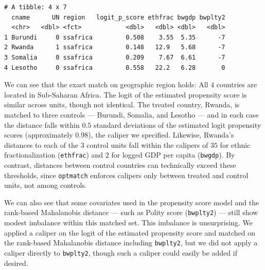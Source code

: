 \documentclass[
  12pt,
  leqno]{article}
\newenvironment{Shaded}{\begin{snugshade}}{\end{snugshade}}
\newcommand{\CommentTok}[1]{\textcolor[rgb]{0.56,0.35,0.01}{\textit{#1}}}
\newcommand{\FunctionTok}[1]{\textcolor[rgb]{0.13,0.29,0.53}{\textbf{#1}}}
\newcommand{\NormalTok}[1]{#1}
\newcommand{\OtherTok}[1]{\textcolor[rgb]{0.56,0.35,0.01}{#1}}
\newcommand{\SpecialCharTok}[1]{\textcolor[rgb]{0.81,0.36,0.00}{\textbf{#1}}}
\newcommand{\StringTok}[1]{\textcolor[rgb]{0.31,0.60,0.02}{#1}}
\begin{document}
\singlespacing

\begin{Shaded}
\end{Shaded}

\begin{verbatim}
# A tibble: 4 x 7
  cname      UN region   logit_p_score ethfrac bwgdp bwplty2
  <chr>   <dbl> <fct>            <dbl>   <dbl> <dbl>   <dbl>
1 Burundi     0 ssafrica         0.508    3.55  5.35      -7
2 Rwanda      1 ssafrica         0.148   12.9   5.68      -7
3 Somalia     0 ssafrica         0.209    7.67  6.61      -7
4 Lesotho     0 ssafrica         0.558   22.2   6.28       0
\end{verbatim}

\doublespacing

We can see that the exact match on geographic region holds: All \(4\)
countries are located in Sub-Saharan Africa. The logit of the estimated
propensity score is similar across units, though not identical. The
treated country, Rwanda, is matched to three controls --- Burundi,
Somalia, and Lesotho --- and in each case the distance falls within
\(0.5\) standard deviations of the estimated logit propensity scores
(approximately 0.98), the caliper we specified. Likewise, Rwanda's
distances to each of the \(3\) control units fall within the calipers of
\(35\) for ethnic fractionalization (\texttt{ethfrac}) and \(2\) for
logged GDP per capita (\texttt{bwgdp}). By contrast, distances between
control countries can technically exceed these thresholds, since
\texttt{optmatch} enforces calipers only between treated and control
units, not among controls.

We can also see that some covariates used in the propensity score model
and the rank-based Mahalanobis distance --- such as Polity score
(\texttt{bwplty2}) --- still show modest imbalance within this matched
set. This imbalance is unsurprising. We applied a caliper on the logit
of the estimated propensity score and matched on the rank-based
Mahalanobis distance including \texttt{bwplty2}, but we did not apply a
caliper directly to \texttt{bwplty2}, though such a caliper could easily
be added if desired.
\end{document}
